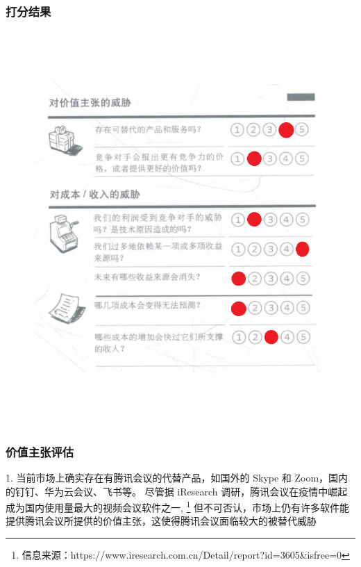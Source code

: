 \documentclass[a4paper,12pt]{article}
\begin{document}
    \subsubsection{打分结果}
    \begin{figure}[htbp]
        \centering
        \includegraphics[width=15cm,height=15cm]{png/评估威胁}
    \end{figure}
    \clearpage %

    \subsubsection{价值主张评估}


    1.
    当前市场上确实存在有腾讯会议的代替产品，如国外的 Skype 和 Zoom，国内的钉钉、华为云会议、飞书等。
    尽管据 iResearch 调研，腾讯会议在疫情中崛起成为国内使用量最大的视频会议软件之一,
    \footnote{信息来源：https://www.iresearch.com.cn/Detail/report?id=3605\&isfree=0}
    但不可否认，市场上仍有许多软件能提供腾讯会议所提供的价值主张，这使得腾讯会议面临较大的被替代威胁
\end{document}
